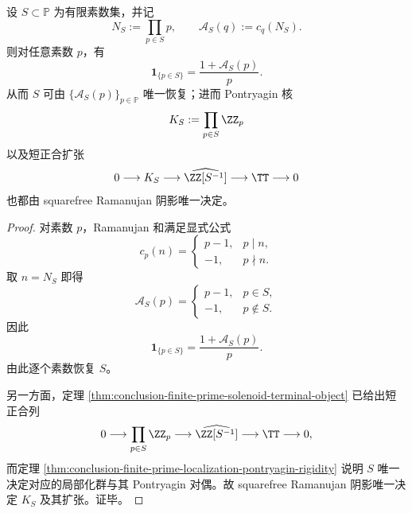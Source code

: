 \begin{theorem}\label{thm:conclusion-squarefree-ramanujan-shadow-recovers-localization-kernel}
设 \(S\subset \mathbb P\) 为有限素数集，并记
\[
N_S:=\prod_{p\in S}p,
\qquad
\mathcal A_S(q):=c_q(N_S).
\]
则对任意素数 \(p\)，有
\[
\mathbf 1_{\{p\in S\}}
=
\frac{1+\mathcal A_S(p)}{p}.
\]
从而 \(S\) 可由 \(\{\mathcal A_S(p)\}_{p\in\mathbb P}\) 唯一恢复；进而 Pontryagin 核
\[
K_S:=\prod_{p\in S}\ZZ_p
\]
以及短正合扩张
\[
0\longrightarrow K_S\longrightarrow \widehat{\ZZ[S^{-1}]}\longrightarrow \TT\longrightarrow 0
\]
也都由 squarefree Ramanujan 阴影唯一决定。
\end{theorem}
\begin{proof}
对素数 \(p\)，Ramanujan 和满足显式公式
\[
c_p(n)=
\begin{cases}
p-1,& p\mid n,\\
-1,& p\nmid n.
\end{cases}
\]
取 \(n=N_S\) 即得
\[
\mathcal A_S(p)=
\begin{cases}
p-1,& p\in S,\\
-1,& p\notin S.
\end{cases}
\]
因此
\[
\mathbf 1_{\{p\in S\}}=\frac{1+\mathcal A_S(p)}{p}.
\]
由此逐个素数恢复 \(S\)。

另一方面，定理 \ref{thm:conclusion-finite-prime-solenoid-terminal-object} 已给出短正合列
\[
0\longrightarrow \prod_{p\in S}\ZZ_p\longrightarrow \widehat{\ZZ[S^{-1}]}\longrightarrow \TT\longrightarrow 0,
\]
而定理 \ref{thm:conclusion-finite-prime-localization-pontryagin-rigidity} 说明 \(S\) 唯一决定对应的局部化群与其 Pontryagin 对偶。故 squarefree Ramanujan 阴影唯一决定 \(K_S\) 及其扩张。证毕。
\end{proof}

